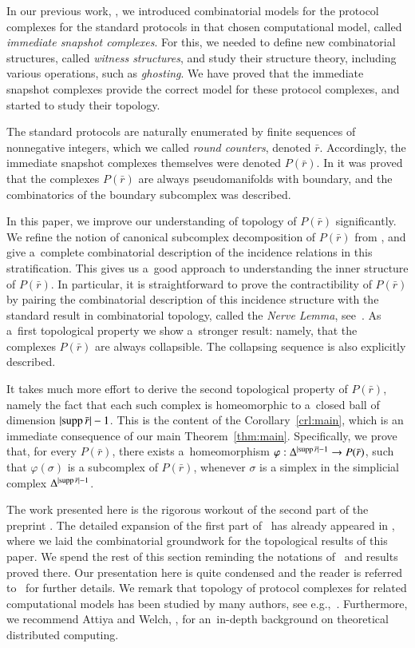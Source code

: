 \documentclass{amsart}[10pt]
\newcommand{\da}{\Delta}
\newcommand{\ra}{\rightarrow}
\newcommand{\supp}{\text{\rm supp}\,}
\newcommand{\tr}{{\bar r}}
\numberwithin{equation}{section}
\numberwithin{figure}{section}
\numberwithin{table}{section}
\begin{document}
In our previous work, \cite{k1}, we introduced combinatorial models
for the protocol complexes for the standard protocols in that chosen
computational model, called {\it immediate snapshot complexes}. For
this, we needed to define new combinatorial structures, called {\it
  witness structures}, and study their structure theory, including
various operations, such as {\it ghosting}. We have proved that the
immediate snapshot complexes provide the correct model for these
protocol complexes, and started to study their topology. 

The standard protocols are naturally enumerated by finite sequences of
nonnegative integers, which we called {\it round counters}, denoted
$\tr$. Accordingly, the immediate snapshot complexes themselves were
denoted $P(\tr)$. In \cite{k1} it was proved that the complexes
$P(\tr)$ are always pseudomanifolds with boundary, and the
combinatorics of the boundary subcomplex was described.

In this paper, we improve our understanding of topology of $P(\tr)$
significantly. We refine the notion of canonical subcomplex
decomposition of $P(\tr)$ from \cite{k1}, and give a~complete
combinatorial description of the incidence relations in this
stratification. This gives us a~good approach to understanding the
inner structure of $P(\tr)$. In particular, it is straightforward to
prove the contractibility of $P(\tr)$ by pairing the combinatorial
description of this incidence structure with the standard result in
combinatorial topology, called the {\it Nerve Lemma},
see~\cite{book}. As a~first topological property we show a~stronger
result: namely, that the complexes $P(\tr)$ are always
collapsible. The collapsing sequence is also explicitly described.

It takes much more effort to derive the second topological property
of $P(\tr)$, namely the fact that each such complex is homeomorphic to
a~closed ball of dimension $|\supp\tr|-1$. This is the content of the
Corollary~\ref{crl:main}, which is an immediate consequence of our
main Theorem~\ref{thm:main}. Specifically, we prove that, for every
$P(\tr)$, there exists a~homeomorphism $\varphi:\da^{|\supp\tr|-1}\ra
P(\tr)$, such that $\varphi(\sigma)$ is a subcomplex of $P(\tr)$,
whenever $\sigma$ is a simplex in the simplicial complex
$\da^{|\supp\tr|-1}$.

The work presented here is the rigorous workout of the second part of
the preprint \cite{kfull}. The detailed expansion of the first part
of~\cite{kfull} has already appeared in \cite{k1}, where we laid the
combinatorial groundwork for the topological results of this paper. We
spend the rest of this section reminding the notations of~\cite{k1}
and results proved there. Our presentation here is quite condensed and
the reader is referred to~\cite{k1} for further details. We remark
that topology of protocol complexes for related computational models
has been studied by many authors, see
e.g.,~\cite{Ha04,HKR,HS,subd,view}. Furthermore, we recommend Attiya
and Welch, \cite{AW}, for an~in-depth background on theoretical
distributed computing.
\end{document}
